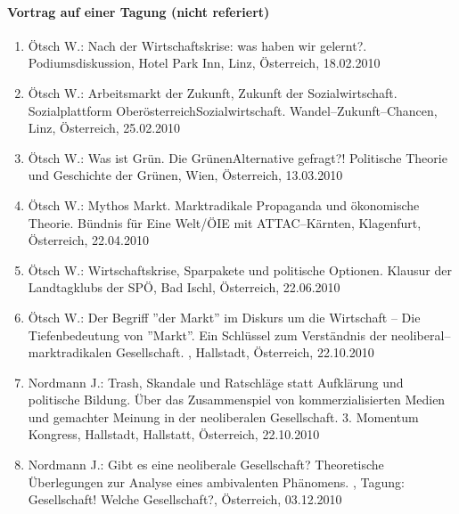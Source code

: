 \paragraph{Vortrag auf einer Tagung (nicht referiert)}
\begin{enumerate}
	\item Ötsch W.: Nach der Wirtschaftskrise: was haben wir gelernt?. Podiumsdiskussion, Hotel Park Inn, Linz, Österreich, 18.02.2010
	\item Ötsch W.: Arbeitsmarkt der Zukunft, Zukunft der Sozialwirtschaft. Sozialplattform OberösterreichSozialwirtschaft. Wandel--Zukunft--Chancen, Linz, Österreich, 25.02.2010
	\item Ötsch W.: Was ist Grün. Die GrünenAlternative gefragt?! Politische Theorie und Geschichte der Grünen, Wien, Österreich, 13.03.2010
	\item Ötsch W.: Mythos Markt. Marktradikale Propaganda und ökonomische Theorie. Bündnis für Eine Welt/ÖIE mit ATTAC--Kärnten, Klagenfurt, Österreich, 22.04.2010
	\item Ötsch W.: Wirtschaftskrise, Sparpakete und politische Optionen. Klausur der Landtagklubs der SPÖ, Bad Ischl, Österreich, 22.06.2010
	\item Ötsch W.: Der Begriff ''der Markt'' im Diskurs um die Wirtschaft -- Die Tiefenbedeutung von ''Markt''. Ein Schlüssel zum Verständnis der neoliberal--marktradikalen Gesellschaft. , Hallstadt, Österreich, 22.10.2010
	\item Nordmann J.: Trash, Skandale und Ratschläge statt Aufklärung und politische Bildung. Über das Zusammenspiel von kommerzialisierten Medien und gemachter Meinung in der neoliberalen Gesellschaft. 3. Momentum Kongress, Hallstadt, Hallstatt, Österreich, 22.10.2010
	\item Nordmann J.: Gibt es eine neoliberale Gesellschaft? Theoretische Überlegungen zur Analyse eines ambivalenten Phänomens. , Tagung: Gesellschaft! Welche Gesellschaft?, Österreich, 03.12.2010
\end{enumerate}
